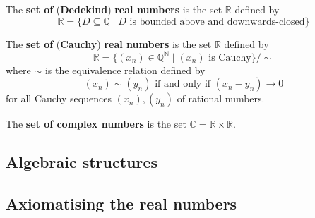 

\begin{definition}
\label{defDedekindReals}
The \textbf{set of} (\textbf{Dedekind}) \textbf{real numbers} is the set $\mathbb{R}$ defined by
\[ \mathbb{R} = \{ D \subseteq \mathbb{Q} \mid D \text{ is bounded above and downwards-closed} \} \]
\end{definition}



\begin{definition}
The \textbf{set of} (\textbf{Cauchy}) \textbf{real numbers} is the set $\mathbb{R}$ defined by
\[ \mathbb{R} = \{ (x_n) \in \mathbb{Q}^{\mathbb{N}} \mid (x_n) \text{ is Cauchy} \} / {\sim} \]
where $\sim$ is the equivalence relation defined by
\[ (x_n) \sim (y_n) \text{ if and only if } (x_n-y_n) \to 0 \]
for all Cauchy sequences $(x_n),(y_n)$ of rational numbers.
\end{definition}



\begin{definition}
\label{defComplexNumbersFromReals}
The \textbf{set of complex numbers} is the set $\mathbb{C} = \mathbb{R} \times \mathbb{R}$.
\end{definition}



\subsection*{Algebraic structures}


\subsection*{Axiomatising the real numbers}

\todo{}

